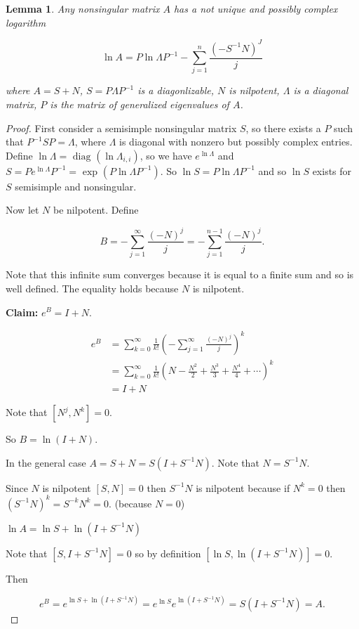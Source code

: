 \documentclass[12pt]{article}
\newtheorem*{lemma}{Lemma}
\theoremstyle{definition}
\begin{document}
\begin{lemma}
Any nonsingular matrix $A$ has a not unique and possibly complex logarithm

\[
\ln A = P \ln \Lambda P^{-1} - \sum_{j = 1}^{n} \frac{(-S^{-1}N)^J}{j}
\]

where $A = S + N$, $S = P \Lambda P^{-1}$ is a diagonlizable, $N$ is nilpotent,
$\Lambda$ is a diagonal matrix, $P$ is the matrix of generalized eigenvalues of $A$. 
\end{lemma}

\begin{proof}
First consider a semisimple nonsingular matrix $S$, so there exists a $P$ such
that $P^{-1}SP = \Lambda$, where $\Lambda$ is diagonal with nonzero but
possibly complex entries. Define $\ln \Lambda = \text{ diag }(\ln \Lambda_{i,i})$,
so we have $e^{\ln \Lambda}$ and 
$S = P e^{\ln \Lambda} P^{-1} = \text{ exp } (P \ln \Lambda P^{-1})$.
So $\ln S = P \ln \Lambda P^{-1}$ and so $\ln S$ exists for $S$ semisimple
and nonsingular.

Now let $N$ be nilpotent. Define

\[
B = - \sum_{j = 1}^{\infty} \frac{(-N)^j}{j} = - \sum_{j = 1}^{n-1} \frac{(-N)^j}{j}.
\]

Note that this infinite sum converges because it is equal to a finite sum and so is
well defined. The equality holds because $N$ is nilpotent.

\textbf{Claim:} $e^{B} = I + N$.

\begin{align*}
e^{B} &= \sum_{k = 0}^{\infty} \frac{1}{k!} \left( - \sum_{j = 1}^{\infty} \frac{(-N)^j}{j} \right)^k \\
&= \sum_{k = 0}^{\infty} \frac{1}{k!} \left( N - \frac{N^2}{2} + \frac{N^3}{3} + \frac{N^4}{4} + \cdots \right)^k \\
&= I + N
\end{align*}

Note that $[N^j, N^k] = 0$.

So $B = \ln (I + N)$.

In the general case $A = S + N = S(I + S^{-1}N)$. Note that $N = S^{-1}N$.

Since $N$ is nilpotent $[S,N] = 0$ then $S^{-1}N$ is nilpotent because if $N^k = 0$ then
$(S^{-1}N)^k = S^{-k}N^k = 0$. (because $N = 0$)

$\ln A = \ln S + \ln(I + S^{-1}N)$

Note that $[S, I + S^{-1}N] = 0$ so by definition $[\ln S, \ln (I + S^{-1}N)] = 0$.

Then

\[
e^B = e^{\ln S + \ln (I + S^{-1}N)} = e^{\ln S} e^{\ln (I + S^{-1}N)} = S(I + S^{-1}N) = A.
\]

\end{proof}
\end{document}
